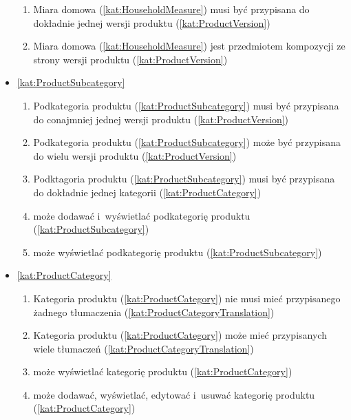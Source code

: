 \begin{itemize}[label={\textbf{Reguły dla}}, wide, labelwidth=!, labelindent=0pt]
\begin{enumerate}[label={\textbf{REG/\protect\threedigits{\arabic{enumi}}}}, wide, labelwidth=!, align=left, leftmargin=3cm, resume]
        \item Miara domowa (\ref{kat:HouseholdMeasure}) musi być przypisana do dokładnie jednej wersji produktu (\ref{kat:ProductVersion})
        \item Miara domowa (\ref{kat:HouseholdMeasure}) jest przedmiotem kompozycji ze strony wersji produktu (\ref{kat:ProductVersion})
    \end{enumerate}
    \item\ref{kat:ProductSubcategory}
    \begin{enumerate}[label={\textbf{REG/\protect\threedigits{\arabic{enumi}}}}, wide, labelwidth=!, align=left, leftmargin=3cm, resume]
        \item Podkategoria produktu (\ref{kat:ProductSubcategory}) musi być przypisana do conajmniej jednej wersji produktu (\ref{kat:ProductVersion})
        \item Podkategoria produktu (\ref{kat:ProductSubcategory}) może być przypisana do wielu wersji produktu (\ref{kat:ProductVersion})
        \item Podktagoria produktu (\ref{kat:ProductSubcategory}) musi być przypisana do dokładnie jednej kategorii (\ref{kat:ProductCategory})
        \item {} może dodawać i~wyświetlać podkategorię produktu (\ref{kat:ProductSubcategory})
        \item {} może wyświetlać podkategorię produktu (\ref{kat:ProductSubcategory})
    \end{enumerate}
    \item\ref{kat:ProductCategory}
    \begin{enumerate}[label={\textbf{REG/\protect\threedigits{\arabic{enumi}}}}, wide, labelwidth=!, align=left, leftmargin=3cm, resume]
        \item Kategoria produktu (\ref{kat:ProductCategory}) nie musi mieć przypisanego żadnego tłumaczenia (\ref{kat:ProductCategoryTranslation})
        \item Kategoria produktu (\ref{kat:ProductCategory}) może mieć przypisanych wiele tłumaczeń (\ref{kat:ProductCategoryTranslation})
        \item {} może wyświetlać kategorię produktu (\ref{kat:ProductCategory})
        \item {} może dodawać, wyświetlać, edytować i~usuwać kategorię produktu (\ref{kat:ProductCategory})
    \end{enumerate}

\end{itemize}
